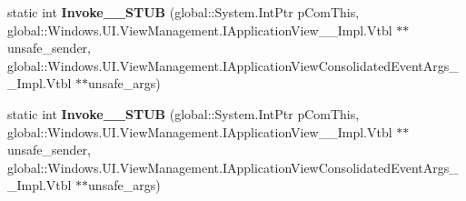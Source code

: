 \begin{DoxyCompactItemize}
\item 
\mbox{\label{struct_windows_1_1_foundation_1_1_typed_event_handler___a___windows___u_i___view_management___ap72530f67d076325c92c48b027e090fa9_a2ce63d428c6a4dcab040c43ee47d14a1}} 
static int {\bfseries Invoke\+\_\+\+\_\+\+S\+T\+UB} (global\+::\+System.\+Int\+Ptr p\+Com\+This, global\+::\+Windows.\+U\+I.\+View\+Management.\+I\+Application\+View\+\_\+\+\_\+\+Impl.\+Vtbl $\ast$$\ast$unsafe\+\_\+sender, global\+::\+Windows.\+U\+I.\+View\+Management.\+I\+Application\+View\+Consolidated\+Event\+Args\+\_\+\+\_\+\+Impl.\+Vtbl $\ast$$\ast$unsafe\+\_\+args)
\item 
\mbox{\label{struct_windows_1_1_foundation_1_1_typed_event_handler___a___windows___u_i___view_management___ap72530f67d076325c92c48b027e090fa9_a2ce63d428c6a4dcab040c43ee47d14a1}} 
static int {\bfseries Invoke\+\_\+\+\_\+\+S\+T\+UB} (global\+::\+System.\+Int\+Ptr p\+Com\+This, global\+::\+Windows.\+U\+I.\+View\+Management.\+I\+Application\+View\+\_\+\+\_\+\+Impl.\+Vtbl $\ast$$\ast$unsafe\+\_\+sender, global\+::\+Windows.\+U\+I.\+View\+Management.\+I\+Application\+View\+Consolidated\+Event\+Args\+\_\+\+\_\+\+Impl.\+Vtbl $\ast$$\ast$unsafe\+\_\+args)
\end{DoxyCompactItemize}
